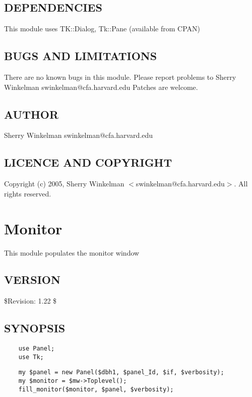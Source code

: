 \documentclass{article}
\begin{document}
\subsection*{DEPENDENCIES\label{MkGroup_DEPENDENCIES}}


This module uses TK::Dialog, Tk::Pane (available from CPAN)

\subsection*{BUGS AND LIMITATIONS\label{MkGroup_BUGS_AND_LIMITATIONS}}


There are no known bugs in this module.
Please report problems to Sherry Winkelman swinkelman@cfa.harvard.edu
Patches are welcome.

\subsection*{AUTHOR\label{MkGroup_AUTHOR}}


Sherry Winkelman swinkelman@cfa.harvard.edu

\subsection*{LICENCE AND COPYRIGHT\label{MkGroup_LICENCE_AND_COPYRIGHT}}


Copyright (c) 2005, Sherry Winkelman $<$swinkelman@cfa.harvard.edu$>$. All rights 
reserved.

\clearpage
\section{Monitor\label{Monitor}}


This module populates the monitor window

\subsection*{VERSION\label{Monitor_VERSION}}


\$Revision: 1.22 \$

\subsection*{SYNOPSIS\label{Monitor_SYNOPSIS}}
\begin{verbatim}
    use Panel;
    use Tk;
\end{verbatim}
\begin{verbatim}
    my $panel = new Panel($dbh1, $panel_Id, $if, $verbosity);
    my $monitor = $mw->Toplevel();
    fill_monitor($monitor, $panel, $verbosity);
\end{verbatim}
\end{document}
